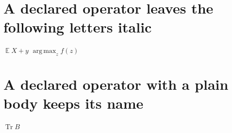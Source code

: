 \documentclass{article}
\DeclareMathOperator{\E}{\mathbb{E}}
\DeclareMathOperator*{\argmax}{arg\,max}
\DeclareMathOperator{\Tr}{Tr}
\DeclareMathOperator*{\argmin}{argmin}
\begin{document}
\section{A declared operator leaves the following letters italic}
$\E X+y$ $\argmax_z f(z)$

\section{A declared operator with a plain body keeps its name}
$\Tr B$

\end{document}

